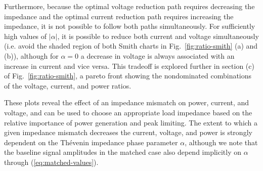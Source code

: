 \documentclass{ifacconf}
\begin{document}
Furthermore, because the optimal voltage reduction path requires decreasing the impedance and the optimal current reduction path requires increasing the impedance, it is not possible to follow both paths simultaneously. For sufficiently high values of $|\alpha|$, it is possible to reduce both current and voltage simultaneously (i.e. avoid the shaded region of both Smith charts in Fig.~\ref{fig:ratio-smith} (a) and (b)), although for $\alpha=0$ a decrease in voltage is always associated with an increase in current and vice versa. This tradeoff is explored further in section (c) of Fig.~\ref{fig:ratio-smith}, a pareto front showing the nondominated combinations of the voltage, current, and power ratios.

These plots reveal the effect of an impedance mismatch on power, current, and voltage, and can be used to choose an appropriate load impedance based on the relative importance of power generation and peak limiting. The extent to which a given impedance mismatch decreases the current, voltage, and power is strongly dependent on the Thévenin impedance phase parameter $\alpha$, although we note that the baseline signal amplitudes in the matched case also depend implicitly on $\alpha$ through (\ref{eq:matched-values}).



\end{document}
